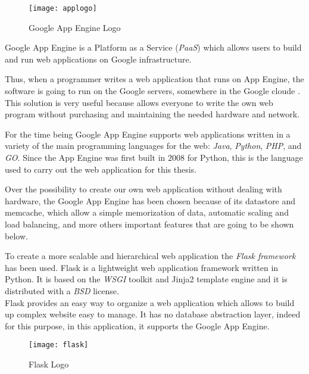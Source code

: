 \begin{figure}[h]
	\centering
	\texttt{[image: applogo]}
	\caption{Google App Engine Logo}
	\label{Fig:applogo}	
\end{figure}

Google App Engine is a Platform as a Service (\textit{PaaS}) which allows users to build and run web applications on Google  infrastructure.

Thus, when a programmer writes a web application that runs on App Engine, the software is going to run on the Google servers, somewhere in the Google cloude \cite{UGAE}. This solution is very useful because allows everyone to write the own web program without purchasing and maintaining the needed hardware and network.

For the time being Google App Engine supports web applications written in a variety of the main programming languages for the web: \textit{Java}, \textit{Python}, \textit{PHP}, and \textit{GO}. Since the App Engine was first built in $2008$ for Python, this is the language used to carry out the web application for this thesis.

Over the possibility to create our own web application without dealing with hardware, the Google App Engine has been chosen because of its datastore and memcache, which allow a simple memorization of data, automatic scaling and load balancing, and more others important features that are going to be shown below.

To create a more scalable and hierarchical web application the \textit{Flask framework} has been used. Flask is a lightweight web application framework written in Python. It is based on the \textit{WSGI} toolkit and Jinja2 template engine and it is distributed with a \textit{BSD} license.\\ Flask provides an easy way to organize a web application which allows to build up complex website easy to manage. It has no database abstraction layer, indeed for this purpose, in this application, it supports the Google App Engine.

\begin{figure}[h]
	\centering
	\texttt{[image: flask]}
	\caption{Flask Logo}
	\label{Fig:flasklogo}	
\end{figure}